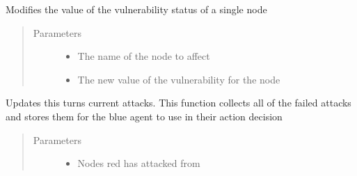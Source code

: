 \documentclass[letterpaper,10pt,english]{sphinxmanual}
\begin{document}
\begin{fulllineitems}
\begin{fulllineitems}
\label{\detokenize{source/yawning_titan.envs.generic.core:yawning_titan.envs.generic.core.network_interface.NetworkInterface.update_single_node_vulnerability}}
\sphinxAtStartPar
Modifies the value of the vulnerability status of a single node
\begin{quote}\begin{description}
\item[{Parameters}] \leavevmode\begin{itemize}
\item {}
\sphinxAtStartPar
{} \textendash{} The name of the node to affect

\item {}
\sphinxAtStartPar
{} \textendash{} The new value of the vulnerability for the node

\end{itemize}

\end{description}\end{quote}

\end{fulllineitems}


\begin{fulllineitems}
\label{\detokenize{source/yawning_titan.envs.generic.core:yawning_titan.envs.generic.core.network_interface.NetworkInterface.update_stored_attacks}}
\sphinxAtStartPar
Updates this turns current attacks. This function collects all of the failed attacks and stores them for the
blue agent to use in their action decision
\begin{quote}\begin{description}
\item[{Parameters}] \leavevmode\begin{itemize}
\item {}
\sphinxAtStartPar
{} \textendash{} Nodes red has attacked from


\end{itemize}
\end{description}
\end{quote}
\end{fulllineitems}
\end{fulllineitems}
\end{document}

